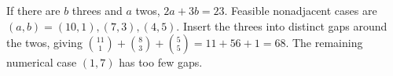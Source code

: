 If there are $b$ threes and $a$ twos, $2a+3b=23$. Feasible nonadjacent cases are $(a,b)=(10,1),(7,3),(4,5)$. Insert the threes into distinct gaps around the twos, giving $\binom{11}1+\binom83+\binom55=11+56+1=\boxed{68}$. The remaining numerical case $(1,7)$ has too few gaps.
